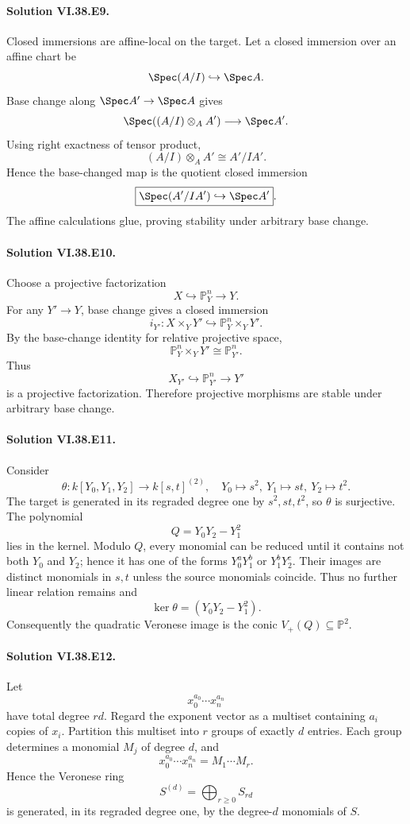 \paragraph{Solution VI.38.E9.}
Closed immersions are affine-local on the target.  Let a closed immersion over an
affine chart be
\[
\Spec(A/I)\hookrightarrow\Spec A.
\]
Base change along \(\Spec A'\to\Spec A\) gives
\[
\Spec((A/I)\otimes_AA')\longrightarrow\Spec A'.
\]
Using right exactness of tensor product,
\[
(A/I)\otimes_AA'\cong A'/IA'.
\]
Hence the base-changed map is the quotient closed immersion
\[
\boxed{\Spec(A'/IA')\hookrightarrow\Spec A'}.
\]
The affine calculations glue, proving stability under arbitrary base change.

\paragraph{Solution VI.38.E10.}
Choose a projective factorization
\[
X\hookrightarrow\mathbb P^n_Y\longrightarrow Y.
\]
For any \(Y'\to Y\), base change gives a closed immersion
\[
i_{Y'}:X\times_YY'\hookrightarrow\mathbb P^n_Y\times_YY'.
\]
By the base-change identity for relative projective space,
\[
\mathbb P^n_Y\times_YY'\cong\mathbb P^n_{Y'}.
\]
Thus
\[
X_{Y'}\hookrightarrow\mathbb P^n_{Y'}\to Y'
\]
is a projective factorization. Therefore projective morphisms are stable under
arbitrary base change.

\paragraph{Solution VI.38.E11.}
Consider
\[
\theta:k[Y_0,Y_1,Y_2]\longrightarrow k[s,t]^{(2)},
\quad
Y_0\mapsto s^2,\ Y_1\mapsto st,\ Y_2\mapsto t^2.
\]
The target is generated in its regraded degree one by \(s^2,st,t^2\), so \(\theta\)
is surjective.  The polynomial
\[
Q=Y_0Y_2-Y_1^2
\]
lies in the kernel.  Modulo \(Q\), every monomial can be reduced until it contains
not both \(Y_0\) and \(Y_2\); hence it has one of the forms
\(Y_0^aY_1^b\) or \(Y_1^bY_2^c\). Their images are distinct monomials in \(s,t\)
unless the source monomials coincide. Thus no further linear relation remains and
\[
\boxed{\ker\theta=(Y_0Y_2-Y_1^2)}.
\]
Consequently the quadratic Veronese image is the conic \(V_+(Q)\subseteq\mathbb P^2\).

\paragraph{Solution VI.38.E12.}
Let
\[
x_0^{a_0}\cdots x_n^{a_n}
\]
have total degree \(rd\).  Regard the exponent vector as a multiset containing
\(a_i\) copies of \(x_i\). Partition this multiset into \(r\) groups of exactly
\(d\) entries. Each group determines a monomial \(M_j\) of degree \(d\), and
\[
x_0^{a_0}\cdots x_n^{a_n}=M_1\cdots M_r.
\]
Hence the Veronese ring
\[
S^{(d)}=\bigoplus_{r\ge0}S_{rd}
\]
is generated, in its regraded degree one, by the degree-\(d\) monomials of \(S\).


